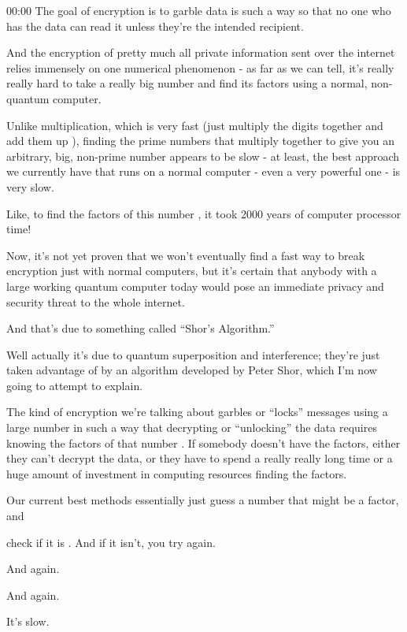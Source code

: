 \documentclass[../main.tex]{subfiles}
\begin{document}
\onlyinsubfile{
}
\notinsubfile{}
\iffalse%
\fi%

00:00	The goal of encryption is to garble data is such a way so that no one who has the data can read it unless they’re the intended recipient.

And the encryption of pretty much all private information sent over the internet relies immensely on one numerical phenomenon - as far as we can tell, it’s really really hard to take a really big number and find its factors using a normal, non-quantum computer.

Unlike multiplication, which is very fast (just multiply the digits together and add them up ), finding the prime numbers that multiply together to give you an arbitrary, big, non-prime number appears to be slow - at least, the best approach we currently have that runs on a normal computer - even a very powerful one - is very slow.

Like, to find the factors of this number , it took 2000 years of computer processor time!

Now, it’s not yet proven that we won’t eventually find a fast way to break encryption just with normal computers, but it’s certain that anybody with a large working quantum computer today would pose an immediate privacy and security threat to the whole internet.

And that’s due to something called “Shor’s Algorithm.”

Well actually it’s due to quantum superposition and interference; they’re just taken advantage of by an algorithm developed by Peter Shor, which I’m now going to attempt to explain.

The kind of encryption we’re talking about garbles or “locks” messages using a large number in such a way that decrypting or “unlocking” the data requires knowing the factors of that number . If somebody doesn’t have the factors, either they can’t decrypt the data, or they have to spend a really really long time or a huge amount of investment in computing resources finding the factors.

Our current best methods essentially just guess a number that might be a factor, and

check if it is . And if it isn’t, you try again.

And again.

And again.

It’s slow.
\end{document}
